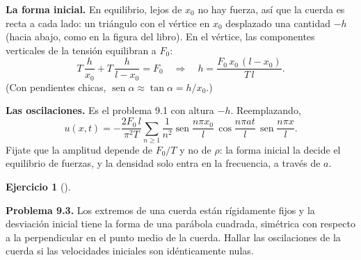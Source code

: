 \documentclass[
  spanish,
  a4paper,
]{scrbook}
\theoremstyle{definition}
\theoremstyle{plain}
\theoremstyle{definition}
\theoremstyle{plain}
\theoremstyle{definition}
\newtheorem{exercise}{Ejercicio}[chapter]
\theoremstyle{remark}
\begin{document}
\begin{tcolorbox}[enhanced jigsaw, arc=.35mm, bottomrule=.15mm, bottomtitle=1mm, breakable, colback=white, colbacktitle=quarto-callout-tip-color!10!white, colframe=quarto-callout-tip-color-frame, coltitle=black, left=2mm, leftrule=.75mm, opacityback=0, opacitybacktitle=0.6, rightrule=.15mm, title=\textcolor{quarto-callout-tip-color}{\faLightbulb}\hspace{0.5em}{Solución}, titlerule=0mm, toprule=.15mm, toptitle=1mm]

\textbf{La forma inicial.} En equilibrio, lejos de \(x_0\) no hay
fuerza, así que la cuerda es recta a cada lado: un triángulo con el
vértice en \(x_0\) desplazado una cantidad \(-h\) (hacia abajo, como en
la figura del libro). En el vértice, las componentes verticales de la
tensión equilibran a \(F_0\): \[
T\,\frac{h}{x_0} + T\,\frac{h}{l-x_0} = F_0 \quad\Longrightarrow\quad h = \frac{F_0\,x_0\,(l-x_0)}{T\,l}.
\] (Con pendientes chicas,
\(\operatorname{sen}\alpha\approx\tan\alpha = h/x_0\).)

\textbf{Las oscilaciones.} Es el problema 9.1 con altura \(-h\).
Reemplazando, \[
u(x,t) = -\frac{2F_0\,l}{\pi^2T}\sum_{n\ge1}\frac{1}{n^2}\operatorname{sen}\frac{n\pi x_0}{l}\,\cos\frac{n\pi at}{l}\,\operatorname{sen}\frac{n\pi x}{l}.
\] Fijate que la amplitud depende de \(F_0/T\) y no de \(\rho\): la
forma inicial la decide el equilibrio de fuerzas, y la densidad solo
entra en la frecuencia, a través de \(a\).

\end{tcolorbox}

\begin{exercise}[]\protect\hypertarget{exr-hip-p3}{}\label{exr-hip-p3}

\textbf{Problema 9.3.} Los extremos de una cuerda están rígidamente
fijos y la desviación inicial tiene la forma de una parábola cuadrada,
simétrica con respecto a la perpendicular en el punto medio de la
cuerda. Hallar las oscilaciones de la cuerda si las velocidades
iniciales son idénticamente nulas.

\end{exercise}
\end{document}
